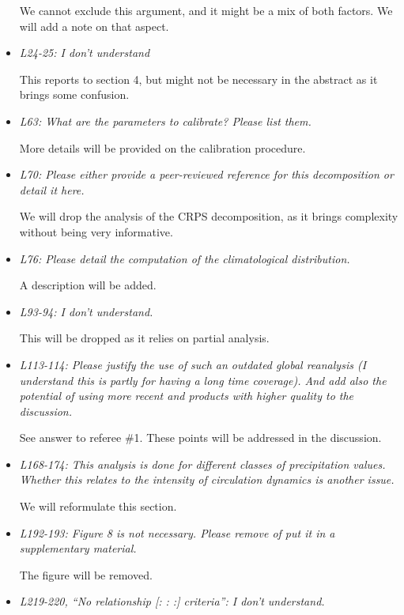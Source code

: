 \documentclass[]{letter}
\begin{document}
\begin{itemize}
	We cannot exclude this argument, and it might be a mix of both factors. We will add a note on that aspect.
	
	\item \textit{L24-25: I don’t understand}
	
	This reports to section 4, but might not be necessary in the abstract as it brings some confusion.
	
	\item \textit{L63: What are the parameters to calibrate? Please list them.}
	
	More details will be provided on the calibration procedure.
	
	\item \textit{L70: Please either provide a peer-reviewed reference for this decomposition or detail it here.}
	
	We will drop the analysis of the CRPS decomposition, as it brings complexity without being very informative.
	
	\item \textit{L76: Please detail the computation of the climatological distribution.}
	
	A description will be added.
	
	\item \textit{L93-94: I don’t understand.}
	
	This will be dropped as it relies on partial analysis.
	
	\item \textit{L113-114: Please justify the use of such an outdated global reanalysis (I understand this is partly for having a long time coverage). And add also the potential of using more recent and products with higher quality to the discussion.}
	
	See answer to referee \#1. These points will be addressed in the discussion. 
	
	\item \textit{L168-174: This analysis is done for different classes of precipitation values. Whether this relates to the intensity of circulation dynamics is another issue.}
	
	We will reformulate this section.
	
	\item \textit{L192-193: Figure 8 is not necessary. Please remove of put it in a supplementary material.}
	
	The figure will be removed.
	
	\item \textit{L219-220, “No relationship [: : :] criteria”: I don’t understand.}
	

\end{itemize}
\end{document}
